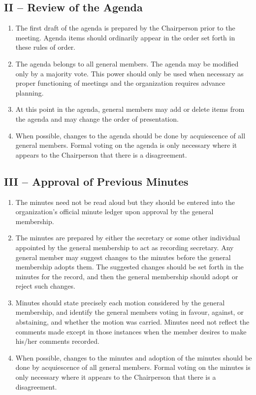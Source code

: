 \documentclass[12pt,a4paper]{article}
\begin{document}
\subsection*{II – Review of the Agenda}

\begin{enumerate}
\item The first draft of the agenda is prepared by the Chairperson prior to the meeting. Agenda items should ordinarily appear in the order set forth in these rules of order.

\item The agenda belongs to all general members. The agenda may be modified only by a majority vote. This power should only be used when necessary as proper functioning of meetings and the organization requires advance planning.

\item At this point in the agenda, general members may add or delete items from the agenda and may change the order of presentation.

\item When possible, changes to the agenda should be done by acquiescence of all general members. Formal voting on the agenda is only necessary where it appears to the Chairperson that there is a disagreement.
\end{enumerate}

\subsection*{III – Approval of Previous Minutes}

\begin{enumerate}
\item The minutes need not be read aloud but they should be entered into the organization's official minute ledger upon approval by the general membership.

\item The minutes are prepared by either the secretary or some other individual appointed by the general membership to act as recording secretary. Any general member may suggest changes to the minutes before the general membership adopts them. The suggested changes should be set forth in the minutes for the record, and then the general membership should adopt or reject such changes.

\item Minutes should state precisely each motion considered by the general membership, and identify the general members voting in favour, against, or abstaining, and whether the motion was carried. Minutes need not reflect the comments made except in those instances when the member desires to make his/her comments recorded.

\item When possible, changes to the minutes and adoption of the minutes should be done by acquiescence of all general members. Formal voting on the minutes is only necessary where it appears to the Chairperson that there is a disagreement.
\end{enumerate}
\end{document}
